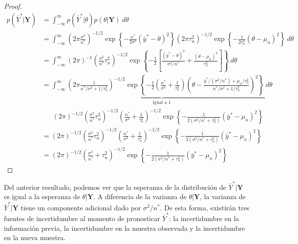 \documentclass[
  10pt,
  spanish,
]{book}
\theoremstyle{definition}
\theoremstyle{definition}
\theoremstyle{definition}
\theoremstyle{definition}
\theoremstyle{remark}
\begin{document}
\begin{proof}
{}\begin{align*}
p(\bar{Y}^*|\mathbf{Y})&=\int_{-\infty}^\infty p(\bar{Y}^*|\theta)p(\theta|\mathbf{Y})\ d\theta\\
&=\int_{-\infty}^\infty (2\pi\frac{\sigma^2}{n^*})^{-1/2}\exp\left\{-\frac{n^*}{2\sigma^2}(\bar{y}^*-\theta)^2\right\}
(2\pi\tau_n^2)^{-1/2}\exp\left\{-\frac{1}{2\tau_n^2}(\theta-\mu_n)^2\right\}\ d\theta\\
&=\int_{-\infty}^\infty (2\pi)^{-1}(\frac{\sigma^2}{n^*}\tau_n^2)^{-1/2}\exp\left\{-\frac{1}{2}\left[\frac{(\bar{y}^*-\theta)^2}{\sigma^2/n^*}+\frac{(\theta-\mu_n)^2}{\tau^2_n}\right]\right\}\ d\theta\\
&=\underbrace{\int_{-\infty}^\infty(2\pi\frac{1}{n^*/\sigma^2+1/\tau^2_n})^{-1/2}\exp\left\{-\frac{1}{2}\left(\frac{n^*}{\sigma^2}+\frac{1}{\tau^2_n}\right)\left(\theta-\frac{\bar{y}^*/(\sigma^2/n^*)+\mu_n/\tau^2_n}{n^*/\sigma^2+1/\tau^2_n}\right)^2\right\}\ d\theta}_{\text{igual a 1}}\\
&\ \ \ \ \ \ \ (2\pi)^{-1/2}(\frac{\sigma^2}{n^*}\tau_n^2)^{-1/2}(\frac{n^*}{\sigma^2}+\frac{1}{\tau^2_n})^{-1/2}\exp\left\{-\frac{1}{2(\sigma^2/n^*+\tau^2_n)}(\bar{y}^*-\mu_n)^2\right\}\\
&=(2\pi)^{-1/2}(\frac{\sigma^2}{n^*}\tau_n^2)^{-1/2}(\frac{n^*}{\sigma^2}+\frac{1}{\tau^2_n})^{-1/2}\exp\left\{-\frac{1}{2(\sigma^2/n^*+\tau^2_n)}(\bar{y}^*-\mu_n)^2\right\}\\
&=(2\pi)^{-1/2}(\frac{\sigma^2}{n^*}+\tau^2_n)^{-1/2}\exp\left\{-\frac{1}{2(\sigma^2/n^*+\tau^2_n)}(\bar{y}^*-\mu_n)^2\right\}
\end{align*}
\end{proof}

Del anterior resultado, podemos ver que la esperanza de la distribución de \(\bar{Y}^*|\mathbf{Y}\) es igual a la esperanza de \(\theta|\mathbf{Y}\). A diferencia de la varianza de \(\theta|\mathbf{Y}\), la varianza de \(\bar{Y}^*|\mathbf{Y}\) tiene un componente adicional dado por \(\sigma^2/n^*\). De esta forma, existirán tres fuentes de incertidumbre al momento de pronosticar \(\bar{Y}^*\): la incertidumbre en la información previa, la incertidumbre en la muestra observada y la incertidumbre en la nueva muestra.
\end{document}
